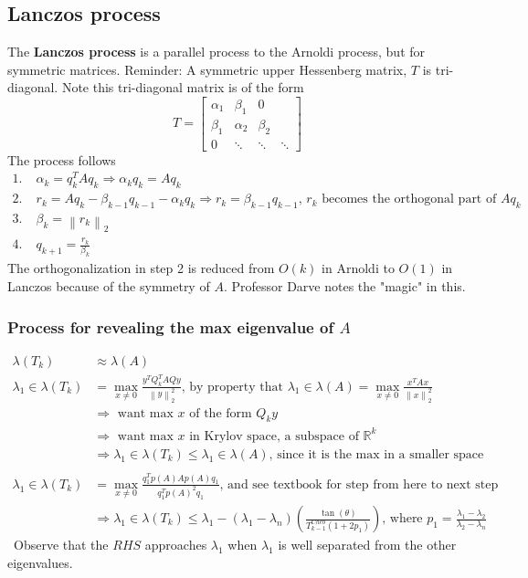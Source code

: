 \documentclass{article}
\newcommand{\norm}[2]{\left\lVert#1\right\rVert_#2}
\begin{document}
\subsection{Lanczos process}
The \textbf{Lanczos process} is a parallel process to the Arnoldi process, but for symmetric matrices. Reminder: A symmetric upper Hessenberg matrix, $T$ is tri-diagonal. Note this tri-diagonal matrix is of the form
\begin{equation*}
    T = \begin{bmatrix}
        \alpha_1 & \beta_1 & 0\\
        \beta_1 & \alpha_2 & \beta_2 \\
        0 & \ddots & \ddots & \ddots
    \end{bmatrix}
\end{equation*}
The process follows
\begin{align*}
    1. \;& \alpha_k = q_k^TAq_k \Longrightarrow \alpha_kq_k = Aq_k\\
    2. \;& r_k = Aq_k - \beta_{k-1}q_{k-1} - \alpha_kq_k \Longrightarrow r_k = \beta_{k-1}q_{k-1} \textrm{, $r_k$ becomes the orthogonal part of $Aq_k$}\\
    3. \;& \beta_k = \norm{r_k}{2}\\
    4. \;& q_{k+1} = \frac{r_k}{\beta_k}
\end{align*}
The orthogonalization in step 2 is reduced from $O(k)$ in Arnoldi to $O(1)$ in Lanczos because of the symmetry of $A$. Professor Darve notes the "magic" in this. 

\subsubsection{Process for revealing the max eigenvalue of $A$}
\begin{align*}
    \lambda(T_k) &\approx \lambda(A)\\
    \lambda_1 \in \lambda(T_k) &= \max_{x \neq 0} \frac{y^TQ_k^TAQy}{\norm{y}{2}^2} \textrm{, by property that } \lambda_1 \in \lambda(A) = \max_{x \neq 0} \frac{x^TAx}{\norm{x}{2}^2}\\
    &\Longrightarrow \textrm{ want max $x$ of the form } Q_ky \\
    &\Longrightarrow \textrm{ want max $x$ in Krylov space, a subspace of } \mathbb{R}^k\\
    &\Longrightarrow \lambda_1 \in \lambda(T_k) \leq \lambda_1 \in \lambda(A) \textrm{, since it is the max in a smaller space} \\ \\
    \lambda_1 \in \lambda(T_k) &= \max_{x \neq 0} \frac{q_1^Tp(A)Ap(A)q_1}{q_1^Tp(A)^2q_1} \textrm{, and see textbook for step from here to next step}\\
    &\Longrightarrow \lambda_1 \in \lambda(T_k) \leq \lambda_1 - (\lambda_1-\lambda_n)(\frac{\tan(\theta)}{T_{k-1}^{Cheb}(1+2p_1)}) \textrm{, where } p_1 = \frac{\lambda_1 - \lambda_2}{\lambda_2 - \lambda_n}
\end{align*}\
Observe that the $RHS$ approaches $\lambda_1$ when $\lambda_1$ is well separated from the other eigenvalues. 
\end{document}
